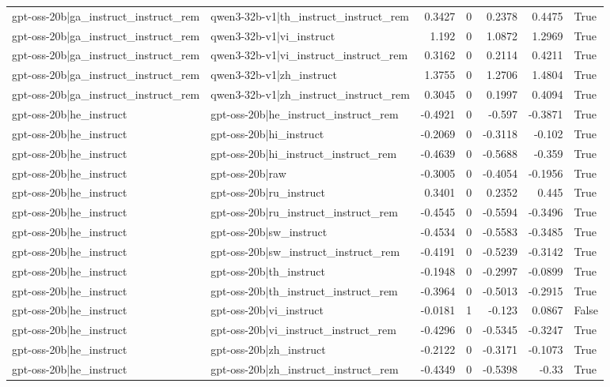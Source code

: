 \begin{table}
\begin{tabular}{l l r r r r l}
gpt-oss-20b|ga_instruct_instruct_rem & qwen3-32b-v1|th_instruct_instruct_rem & 0.3427 & 0 & 0.2378 & 0.4475 & True \\
gpt-oss-20b|ga_instruct_instruct_rem & qwen3-32b-v1|vi_instruct & 1.192 & 0 & 1.0872 & 1.2969 & True \\
gpt-oss-20b|ga_instruct_instruct_rem & qwen3-32b-v1|vi_instruct_instruct_rem & 0.3162 & 0 & 0.2114 & 0.4211 & True \\
gpt-oss-20b|ga_instruct_instruct_rem & qwen3-32b-v1|zh_instruct & 1.3755 & 0 & 1.2706 & 1.4804 & True \\
gpt-oss-20b|ga_instruct_instruct_rem & qwen3-32b-v1|zh_instruct_instruct_rem & 0.3045 & 0 & 0.1997 & 0.4094 & True \\
gpt-oss-20b|he_instruct & gpt-oss-20b|he_instruct_instruct_rem & -0.4921 & 0 & -0.597 & -0.3871 & True \\
gpt-oss-20b|he_instruct & gpt-oss-20b|hi_instruct & -0.2069 & 0 & -0.3118 & -0.102 & True \\
gpt-oss-20b|he_instruct & gpt-oss-20b|hi_instruct_instruct_rem & -0.4639 & 0 & -0.5688 & -0.359 & True \\
gpt-oss-20b|he_instruct & gpt-oss-20b|raw & -0.3005 & 0 & -0.4054 & -0.1956 & True \\
gpt-oss-20b|he_instruct & gpt-oss-20b|ru_instruct & 0.3401 & 0 & 0.2352 & 0.445 & True \\
gpt-oss-20b|he_instruct & gpt-oss-20b|ru_instruct_instruct_rem & -0.4545 & 0 & -0.5594 & -0.3496 & True \\
gpt-oss-20b|he_instruct & gpt-oss-20b|sw_instruct & -0.4534 & 0 & -0.5583 & -0.3485 & True \\
gpt-oss-20b|he_instruct & gpt-oss-20b|sw_instruct_instruct_rem & -0.4191 & 0 & -0.5239 & -0.3142 & True \\
gpt-oss-20b|he_instruct & gpt-oss-20b|th_instruct & -0.1948 & 0 & -0.2997 & -0.0899 & True \\
gpt-oss-20b|he_instruct & gpt-oss-20b|th_instruct_instruct_rem & -0.3964 & 0 & -0.5013 & -0.2915 & True \\
gpt-oss-20b|he_instruct & gpt-oss-20b|vi_instruct & -0.0181 & 1 & -0.123 & 0.0867 & False \\
gpt-oss-20b|he_instruct & gpt-oss-20b|vi_instruct_instruct_rem & -0.4296 & 0 & -0.5345 & -0.3247 & True \\
gpt-oss-20b|he_instruct & gpt-oss-20b|zh_instruct & -0.2122 & 0 & -0.3171 & -0.1073 & True \\
gpt-oss-20b|he_instruct & gpt-oss-20b|zh_instruct_instruct_rem & -0.4349 & 0 & -0.5398 & -0.33 & True \\

\end{tabular}
\end{table}
